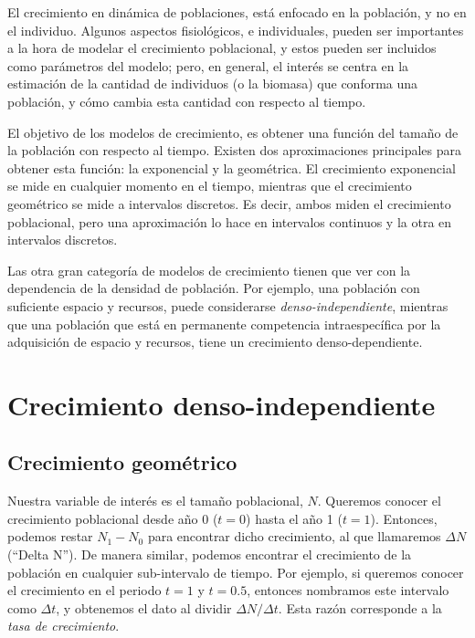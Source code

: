 \documentclass[12pt,letterpaper,]{book}
\begin{document}
El crecimiento en dinámica de poblaciones, está
enfocado en la población, y no en el individuo. Algunos aspectos
fisiológicos, e individuales, pueden ser importantes a la hora de
modelar el crecimiento poblacional, y estos pueden ser incluidos como
parámetros del modelo; pero, en general, el interés se centra en la
estimación de la cantidad de individuos (o la biomasa) que conforma una
población, y cómo cambia esta cantidad con respecto al tiempo.

El objetivo de los modelos de crecimiento, es obtener una función del
tamaño de la población con respecto al tiempo. Existen dos
aproximaciones principales para obtener esta función: la exponencial y
la geométrica. El crecimiento exponencial se mide en cualquier momento
en el tiempo, mientras que el crecimiento geométrico se mide a
intervalos discretos. Es decir, ambos miden el crecimiento poblacional,
pero una aproximación lo hace en intervalos continuos y la otra en
intervalos discretos.

Las otra gran categoría de modelos de crecimiento tienen que ver con la
dependencia de la densidad de población. Por ejemplo, una población con
suficiente espacio y recursos, puede considerarse
\emph{denso-independiente}, mientras que una población que está en
permanente competencia intraespecífica por la adquisición de espacio y
recursos, tiene un crecimiento denso-dependiente.

\section{Crecimiento
denso-independiente}\label{crecimiento-denso-independiente}


\subsection{Crecimiento geométrico}\label{crecimiento-geometrico}


Nuestra variable de interés es el tamaño poblacional, \(N\). Queremos
conocer el crecimiento poblacional desde año 0 (\(t=0\)) hasta el año 1
(\(t=1\)). Entonces, podemos restar \(N_1 - N_0\) para encontrar dicho
crecimiento, al que llamaremos \(\Delta N\) (``Delta N''). De manera
similar, podemos encontrar el crecimiento de la población en cualquier
sub-intervalo de tiempo. Por ejemplo, si queremos conocer el crecimiento
en el periodo \(t=1\) y \(t=0.5\), entonces nombramos este intervalo
como \(\Delta t\), y obtenemos el dato al dividir
\(\Delta N / \Delta t\). Esta razón corresponde a la \emph{tasa de
crecimiento}.
\end{document}
